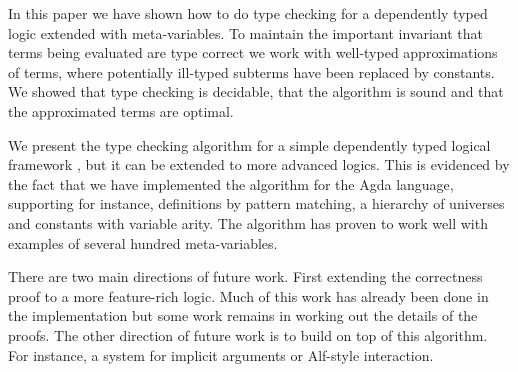 
In this paper we have shown how to do type checking for a dependently typed
logic extended with meta-variables. To maintain the important invariant that
terms being evaluated are type correct we work with well-typed approximations
of terms, where potentially ill-typed subterms have been replaced by constants.
We showed that type checking is decidable, that the algorithm is sound and that
the approximated terms are optimal.

We present the type checking algorithm for a simple dependently typed logical
framework {\Core}, but it can be extended to more advanced logics.  This is
evidenced by the fact that we have implemented the algorithm for the
Agda language, supporting for instance, definitions by pattern
matching, a hierarchy of universes and constants with variable arity. The
algorithm has proven to work well with examples of several hundred meta-variables.

There are two main directions of future work. First extending the correctness
proof to a more feature-rich logic. Much of this work has already been done
in the implementation but some work remains in working out the details of the
proofs. The other direction of future work is to build on top of this
algorithm. For instance, a system for implicit arguments or Alf-style
interaction\cite{magnussonnordstrom:alf}.

